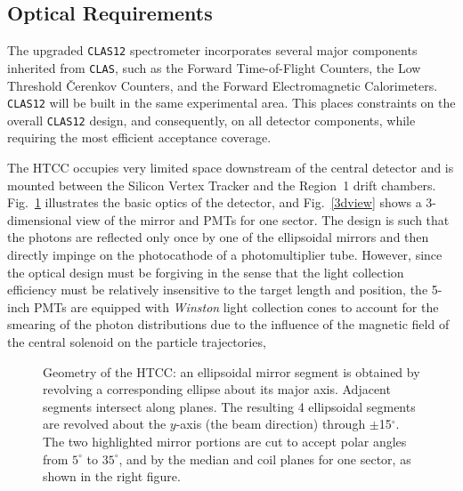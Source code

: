 \subsection{Optical Requirements}
\label{Optical Requirements}

The upgraded {\tt CLAS12} spectrometer incorporates several major components 
inherited from {\tt CLAS}, such as the Forward Time-of-Flight Counters, 
the Low Threshold {\v C}erenkov Counters, and the Forward Electromagnetic 
Calorimeters.  {\tt CLAS12} will be built in the same experimental area. 
This places constraints on the overall {\tt CLAS12} design, and consequently,
on all detector components, while requiring the most efficient acceptance 
coverage.

The HTCC occupies very limited space downstream of the central detector
and is mounted between the Silicon Vertex Tracker and the Region~1 drift 
chambers.  Fig.~\ref{geometry} illustrates the basic optics of the detector, 
and Fig.~\ref{3dview} shows a 3-dimensional view of the mirror and 
PMTs for one sector.  The design is such that the photons are reflected only 
once by one of the ellipsoidal mirrors and then directly impinge on the 
photocathode of a photomultiplier tube.  However, since the optical design 
must be forgiving in the sense that the light collection efficiency must be 
relatively insensitive to the target length and position, the 5-inch PMTs 
are equipped with {\it Winston} light collection cones to account for the
smearing of the photon distributions due to the influence of the magnetic 
field of the central solenoid on the particle trajectories, 

\begin{figure}[ht]
\begin{center}
\caption{\small{Geometry of the HTCC: an ellipsoidal mirror segment is 
obtained by revolving a corresponding ellipse about its major axis. 
Adjacent segments intersect along planes.  The resulting 4 ellipsoidal 
segments are revolved about the $y$-axis (the beam direction) through 
$\pm$15$^\circ$.  The two highlighted mirror portions are cut to accept 
polar angles from $5^\circ$ to $35^\circ$, and by the median and coil 
planes for one sector, as shown in the right figure.}}
\label{geometry}
\end{center}
\end{figure}

